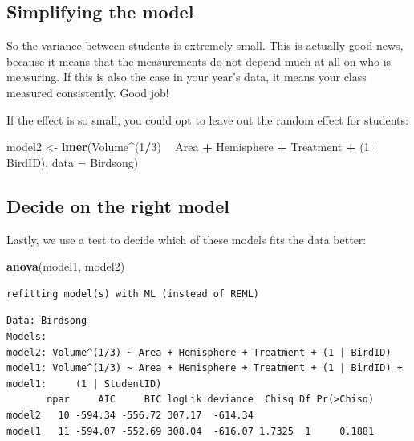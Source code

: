 \documentclass[
]{book}
\newenvironment{Shaded}{\begin{snugshade}}{\end{snugshade}}
\newcommand{\DataTypeTok}[1]{\textcolor[rgb]{0.13,0.29,0.53}{#1}}
\newcommand{\DecValTok}[1]{\textcolor[rgb]{0.00,0.00,0.81}{#1}}
\newcommand{\KeywordTok}[1]{\textcolor[rgb]{0.13,0.29,0.53}{\textbf{#1}}}
\newcommand{\NormalTok}[1]{#1}
\newcommand{\OperatorTok}[1]{\textcolor[rgb]{0.81,0.36,0.00}{\textbf{#1}}}
\newcommand{\StringTok}[1]{\textcolor[rgb]{0.31,0.60,0.02}{#1}}
\begin{document}
\hypertarget{simplifying-the-model}{%
\subsection{Simplifying the model}\label{simplifying-the-model}}

So the variance between students is extremely small. This is actually good news, because it means that the measurements do not depend much at all on who is measuring. If this is also the case in your year's data, it means your class measured consistently. Good job!

If the effect is so small, you could opt to leave out the random effect for students:

\begin{Shaded}
\begin{Highlighting}[]
\NormalTok{model2 <-}\StringTok{ }\KeywordTok{lmer}\NormalTok{(Volume}\OperatorTok{^}\NormalTok{(}\DecValTok{1}\OperatorTok{/}\DecValTok{3}\NormalTok{) }\OperatorTok{~}\StringTok{ }\NormalTok{Area }\OperatorTok{+}\StringTok{ }\NormalTok{Hemisphere }\OperatorTok{+}\StringTok{ }\NormalTok{Treatment }\OperatorTok{+}\StringTok{ }\NormalTok{(}\DecValTok{1} \OperatorTok{|}\StringTok{ }\NormalTok{BirdID), }\DataTypeTok{data =}\NormalTok{ Birdsong)}
\end{Highlighting}
\end{Shaded}

\hypertarget{comparebrain}{%
\subsection{Decide on the right model}\label{comparebrain}}

Lastly, we use a test to decide which of these models fits the data better:

\begin{Shaded}
\begin{Highlighting}[]
\KeywordTok{anova}\NormalTok{(model1, model2)                                                           }
\end{Highlighting}
\end{Shaded}

\begin{verbatim}
refitting model(s) with ML (instead of REML)
\end{verbatim}

\begin{verbatim}
Data: Birdsong
Models:
model2: Volume^(1/3) ~ Area + Hemisphere + Treatment + (1 | BirdID)
model1: Volume^(1/3) ~ Area + Hemisphere + Treatment + (1 | BirdID) + 
model1:     (1 | StudentID)
       npar     AIC     BIC logLik deviance  Chisq Df Pr(>Chisq)
model2   10 -594.34 -556.72 307.17  -614.34                     
model1   11 -594.07 -552.69 308.04  -616.07 1.7325  1     0.1881
\end{verbatim}
\end{document}
